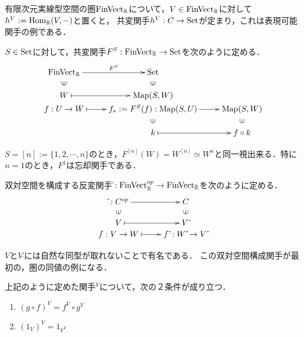 \documentclass[uplatex, dvipdfmx]{jsreport}
\begin{document}
\begin{definition}[表現可能関手$h^V$]
    有限次元実線型空間の圏$\mathrm{FinVect}_{\mathbb{R}}$について，$V\in\mathrm{FinVect}_{\mathbb{R}}$に対して$h^V:=\mathrm{Hom}_{\mathbb{R}}(V,-)$と置くと，
    共変関手$h^V:C\to\mathrm{Set}$が定まり，これは表現可能関手の例である．
\end{definition}
\begin{definition}[共変関手$F^S$]
    $S\in\mathrm{Set}$に対して，共変関手$F^S:\mathrm{FinVect}_{\mathbb{R}}\to\mathrm{Set}$を次のように定める．
    \[\xymatrix@R-2pc{
        \FinVect_\R\ar[r]^-{F^S}&\Set\\
        \rotatebox{90}{$\in$}&\rotatebox{90}{$\in$}\\
        W\ar@{|->}[r]&\Map(S,W)\\
        f:U\to W\ar@{|->}[r]&f_*:=F^S(f):\Map(S,U)\ar[r]&\Map(S,W)\\
        &\rotatebox{90}{$\in$}&\rotatebox{90}{$\in$}\\
        &k\ar@{|->}[r]&f\circ k
    }\]
\end{definition}
\begin{remark}
    $S=[n]:=\{1,2,\cdots,n\}$のとき，$F^{[n]}(W)=W^{[n]}\simeq W^n$と同一視出来る．特に$n=1$のとき，$F^1$は忘却関手である．
\end{remark}
\begin{definition}[双対関手]
    双対空間を構成する反変関手$\check{}:\mathrm{FinVect}_{\mathbb{R}}^{op}\to\mathrm{FinVect}_{\mathbb{R}}$を次のように定める．
    \[\xymatrix@R-2pc{
        {\check{}:C^{op}}\ar[r]&C\\
        {\rotatebox{90}{$\in$}}&{\rotatebox{90}{$\in$}}\\
        V\ar@{|->}[r]&{V\,\check{}}\\
        {f:V\to W}\ar@{|->}[r]&{f\,\check{}:W\,\check{}\to V\,\check{}}
    }\]
\end{definition}
\begin{remark}
    $V$と$V\,\check{}$には自然な同型が取れないことで有名である．
    この双対空間構成関手$\check{}$が最初の，圏の同値の例になる．
\end{remark}
\begin{lemma}
    上記のように定めた関手${}^V$について，次の２条件が成り立つ．
    \begin{enumerate}
        \item $(g\circ f)^V = f^V\circ g^V$
        \item $(1_V)^V = 1_{V^V}$
    \end{enumerate}
\end{lemma}
\end{document}
